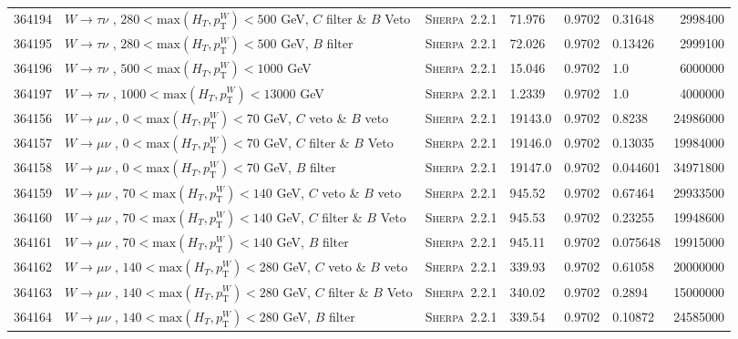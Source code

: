 \begin{table}[!htb]
{\begin{tabular}{llllllr}
      364194 & $W \to \tau\nu $ , $280<\text{max}(H_T,p_{\text{T}}^W)<500$ GeV,  $C$ filter \& $B$ Veto & \textsc{Sherpa}~2.2.1 &71.976    & 0.9702 & 0.31648 & 2998400 \\
      364195 & $W \to \tau\nu $ , $280<\text{max}(H_T,p_{\text{T}}^W)<500$ GeV, $B$ filter & \textsc{Sherpa}~2.2.1 &             72.026    & 0.9702 & 0.13426 & 2999100 \\
      364196 & $W \to \tau\nu $ , $500<\text{max}(H_T,p_{\text{T}}^W)<1000$ GeV                      & \textsc{Sherpa}~2.2.1 &   15.046    & 0.9702 & 1.0 	& 6000000 \\
      364197 & $W \to \tau\nu $ , $1000<\text{max}(H_T,p_{\text{T}}^W)<13000$ GeV                       & \textsc{Sherpa}~2.2.1 &1.2339    & 0.9702 & 1.0 	& 4000000 \\
      364156 & $W \to \mu\nu $ , $0<\text{max}(H_T,p_{\text{T}}^W)<70$ GeV, $C$ veto \& $B$ veto & \textsc{Sherpa}~2.2.1 &      19143.0        & 0.9702& 0.8238  & 24986000 \\
      364157 & $W \to \mu\nu $ , $0<\text{max}(H_T,p_{\text{T}}^W)<70$ GeV,  $C$ filter \& $B$ Veto & \textsc{Sherpa}~2.2.1 &   19146.0        & 0.9702& 0.13035 & 19984000 \\
      364158 & $W \to \mu\nu $ , $0<\text{max}(H_T,p_{\text{T}}^W)<70$ GeV, $B$ filter & \textsc{Sherpa}~2.2.1 &                19147.0        & 0.9702& 0.044601& 34971800 \\
      364159 & $W \to \mu\nu $ , $70<\text{max}(H_T,p_{\text{T}}^W)<140$ GeV, $C$ veto \& $B$ veto & \textsc{Sherpa}~2.2.1 &    945.52         & 0.9702& 0.67464 & 29933500 \\
      364160 & $W \to \mu\nu $ , $70<\text{max}(H_T,p_{\text{T}}^W)<140$ GeV,  $C$ filter \& $B$ Veto & \textsc{Sherpa}~2.2.1 & 945.53         & 0.9702& 0.23255 & 19948600 \\
      364161 & $W \to \mu\nu $ , $70<\text{max}(H_T,p_{\text{T}}^W)<140$ GeV, $B$ filter & \textsc{Sherpa}~2.2.1 &              945.11         & 0.9702& 0.075648& 19915000 \\
      364162 & $W \to \mu\nu $ , $140<\text{max}(H_T,p_{\text{T}}^W)<280$ GeV, $C$ veto \& $B$ veto & \textsc{Sherpa}~2.2.1 &   339.93         & 0.9702& 0.61058 & 20000000 \\
      364163 & $W \to \mu\nu $ , $140<\text{max}(H_T,p_{\text{T}}^W)<280$ GeV,  $C$ filter \& $B$ Veto & \textsc{Sherpa}~2.2.1 &340.02         & 0.9702& 0.2894  & 15000000 \\
      364164 & $W \to \mu\nu $ , $140<\text{max}(H_T,p_{\text{T}}^W)<280$ GeV, $B$ filter & \textsc{Sherpa}~2.2.1 &             339.54         & 0.9702& 0.10872 & 24585000 \\

\end{tabular}}
\end{table}
